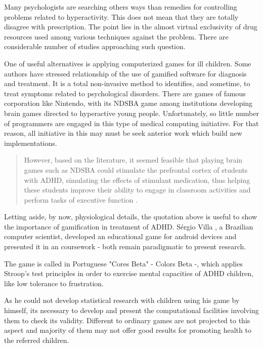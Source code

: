 Many psychologists are searching others ways than remedies for controlling problems related to hyperactivity. This does not mean that they are totally disagree with prescription. The point lies in the almost virtual exclusivity of drug resources used among various techniques against the problem. There are considerable number of studies approaching such question.

One of useful alternatives is applying computerized games for ill children. Some authors have stressed relationship of the use of gamified software for diagnosis and treatment. It is a total non-invasive method to identifies, and sometime, to treat symptoms related to psychological disorders. There are games of famous corporation like Nintendo, with its NDSBA game among institutions developing brain games directed to hyperactive young people. Unfortunately, so little number of programmers are engaged in this type of medical computing initiative. For that reason, all initiative in this may must be seek anterior work which build new implementations. 

\begin{quote}
However, based on the literature, it seemed feasible that playing brain games such as NDSBA could stimulate the prefrontal cortex of students with ADHD, simulating the effects of stimulant medication, thus helping these students improve their ability to engage in classroom activities and perform tasks of executive function \citep{brainGames}. 
\end{quote}

Letting aside, by now, physiological details, the quotation above is useful to show the importance of gamification in treatment of ADHD. S\'{e}rgio Villa \citeyearpar{Villa}, a Brazilian computer scientist, developed an educational game for android devices and presented it in an coursework - both remain paradigmatic to present research.

The game is called in Portuguese "Cores Beta" - Colors Beta -, which applies Stroop's test principles in order to exercise mental capacities of ADHD children, like low tolerance to frustration. 

As he could not develop statistical research with children using his game by himself, its necessary to develop and present the computational facilities involving them to check its validity. Different to ordinary games are not projected to this aspect and majority of them may not offer good results for promoting health to the referred children. 

